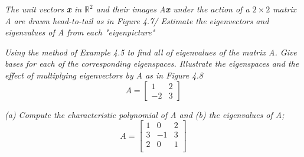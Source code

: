 \documentclass[12pt,letterpaper]{hmcpset}
\begin{document}


\begin{problem}[4.1.20]
\textit{The unit vectors \textbf{x} in $\mathbb{R}^2$ and their images A\textbf{x} under the action of a $2\times 2$ matrix A are drawn head-to-tail as in Figure 4.7/ Estimate the eigenvectors and eigenvalues of A from each "eigenpicture"}
\end{problem}




\begin{solution}

\end{solution}

\newpage



\begin{problem}[4.1.26]
\textit{Using the method of Example 4.5 to find all of eigenvalues of the matrix A. Give bases for each of the corresponding eigenspaces. Illustrate the eigenspaces and the effect of multiplying eigenvectors by A as in Figure 4.8}
$$ A = \begin{bmatrix}
1&2\\-2&3
\end{bmatrix}
$$
\end{problem}

\begin{solution}
\end{solution}

\newpage



\begin{problem}[4.3.6 ]
\textit{(a) Compute the characteristic polynomial of A and (b) the eigenvalues of A;}
$$
A = \begin{bmatrix}
1&0&2\\
3&-1&3\\
2&0&1\\
\end{bmatrix}
$$
\end{problem}

\begin{solution}
\end{solution}

\newpage

\end{document}
